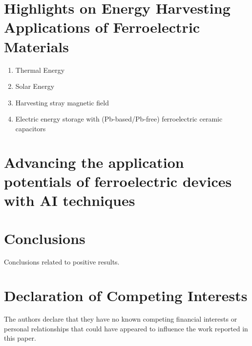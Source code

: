 \documentclass[a4paper,fleqn]{cas-sc}
\begin{document}
\section{Highlights on Energy Harvesting Applications of Ferroelectric Materials}\label{results_discussions}
\begin{enumerate}
    \item Thermal Energy
    \item Solar Energy
    \item Harvesting stray magnetic field
    \item Electric energy storage with (Pb-based/Pb-free) ferroelectric ceramic capacitors
\end{enumerate}

\section{Advancing the application potentials of ferroelectric devices with AI techniques} \label{emergent_technology}




\section{Conclusions}\label{conclusions}
Conclusions related to positive results.

\section*{Declaration of Competing Interests}
The authors declare that they have no known competing ﬁnancial interests or personal relationships that could have appeared to inﬂuence the work reported in this paper.

\end{document}
